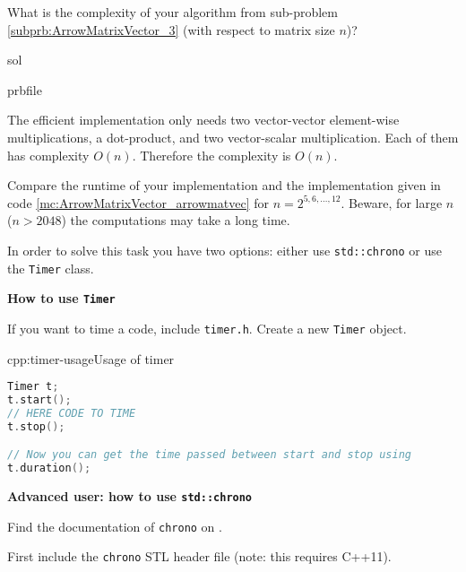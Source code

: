 \begin{samproblem}
\begin{subproblem}{}
What is the complexity of your algorithm from sub-problem
\ref{subprb:ArrowMatrixVector_3} (with respect to matrix size $n$)?
\begin{samwriteprbpart}{sol}
    \begin{writeverbatim}{prbfile}
\begin{samsolution}
  The efficient implementation only needs two vector-vector element-wise
  multiplications, a dot-product, and
  two vector-scalar multiplication. Each of them has complexity $O(n)$.
  Therefore the complexity is $O(n)$.
\end{samsolution}
\end{writeverbatim}
\end{samwriteprbpart}

\end{subproblem}

\begin{subproblem}{}
  Compare the runtime of your implementation and the implementation given in code
  \ref{mc:ArrowMatrixVector_arrowmatvec} for $n=2^{5,6,\ldots,12}$.
  Beware, for large $n$ ($n > 2048$) the computations may take a long time.

  In order to solve this task you have two options:
  either use \texttt{std::chrono} or use the \texttt{Timer} class.

  \textbf{How to use \texttt{Timer}}

  If you want to time a code, include \texttt{timer.h}.
  Create a new \texttt{Timer} object.
  \begin{samcode}[C++11-code]{cpp:timer-usage}{Usage of timer}
    \begin{lstlisting}[language=C++, style=cpp]
Timer t;
t.start();
// HERE CODE TO TIME
t.stop();

// Now you can get the time passed between start and stop using
t.duration();
    \end{lstlisting}
  \end{samcode}

  \textbf{Advanced user: how to use \texttt{std::chrono}}

  Find the documentation of \texttt{chrono}
  on .

  First include the \texttt{chrono} STL header file (note: this requires C++11).


\end{subproblem}
\end{samproblem}
